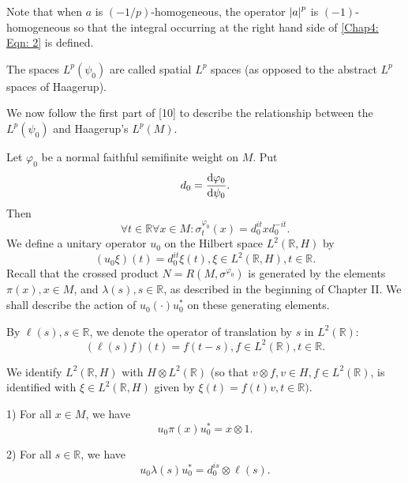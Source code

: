 Note that when $a$ is $(-1/p)$-homogeneous, the operator $\abs{a}^p$ is $(-1)$-homogeneous so that the integral occurring at the right hand side of \eqref{Chap4: Eqn: 2} is defined.\par
The spaces $L^p(\psi_0)$ are called spatial $L^p$ spaces (as opposed to the abstract $L^p$ spaces of Haagerup).\par
We now follow the first part of [10] to describe the relationship between the $L^p(\psi_0)$ and Haagerup's $L^p(M)$.\par
Let $\varphi_0$ be a normal faithful semifinite weight on $M$. Put
\begin{equation}
    d_0=\dv{\varphi_0}{\psi_0}.
\end{equation}
Then
\begin{equation}
    \forall t\in \mathbb{R}\forall x\in M:\sigma_t^{\varphi_0}(x)=d_0^{it}xd_0^{-it}.
\end{equation}
We define a unitary operator $u_0$ on the Hilbert space $L^2(\mathbb{R},H)$ by
\begin{equation}\label{Chap4: Eqn: 7}
    (u_0\xi)(t)=d_0^{it}\xi(t),\xi\in L^2(\mathbb{R},H),t\in \mathbb{R}.
\end{equation}
Recall that the crossed product $N=R(M,\sigma^{\varphi_0})$ is generated by the elements $\pi(x),x\in M$, and $\lambda(s),s\in \mathbb{R}$, as described in the beginning of Chapter II. We shall describe the action of $u_0(\cdot)u_0^*$ on these generating elements.\par
By $\ell(s), s\in \mathbb{R}$, we denote the operator of translation by $s$ in $L^2(\mathbb{R})$:
\[
    (\ell(s)f)(t)=f(t-s),f\in L^2(\mathbb{R}),t\in \mathbb{R}.
\]\par
We identify $L^2(\mathbb{R},H)$ with $H\otimes L^2(\mathbb{R})$ (so that $v\otimes f,v\in H,f\in L^2(\mathbb{R})$, is identified with $\xi\in L^2(\mathbb{R},H)$ given by $\xi(t)=f(t)v,t\in \mathbb{R})$.
\begin{proposition}\label{Chap4: Prop: 3}
    1) For all $x\in M$, we have
    \[
        u_0\pi(x)u_0^*=x\otimes 1.
    \]

    2) For all $s\in \mathbb{R}$, we have
    \[
        u_0\lambda(s)u_0^*=d_0^{is}\otimes \ell(s).
    \]
\end{proposition}
